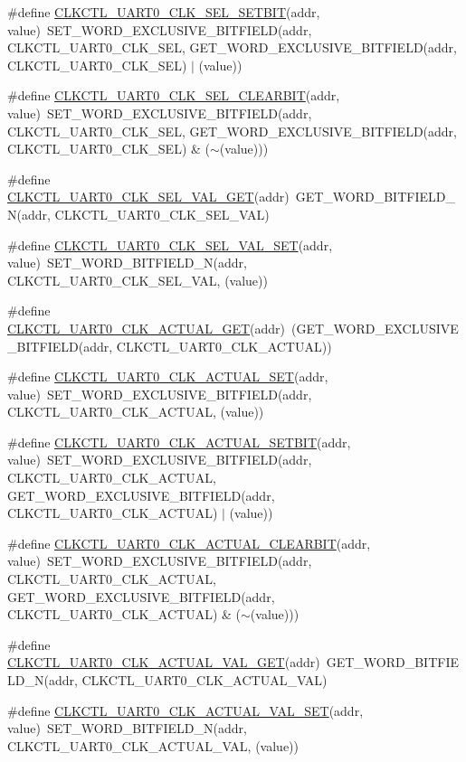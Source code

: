 \begin{DoxyCompactItemize}
\item 
\#define \hyperlink{a00544_acfc5eb0f16914ab40caef3c6a682eee4}{CLKCTL\_\-UART0\_\-CLK\_\-SEL\_\-SETBIT}(addr, value)~SET\_\-WORD\_\-EXCLUSIVE\_\-BITFIELD(addr, CLKCTL\_\-UART0\_\-CLK\_\-SEL, GET\_\-WORD\_\-EXCLUSIVE\_\-BITFIELD(addr, CLKCTL\_\-UART0\_\-CLK\_\-SEL) $|$ (value))
\item 
\#define \hyperlink{a00544_a01dab1e615b3ad7a91deff982d57714c}{CLKCTL\_\-UART0\_\-CLK\_\-SEL\_\-CLEARBIT}(addr, value)~SET\_\-WORD\_\-EXCLUSIVE\_\-BITFIELD(addr, CLKCTL\_\-UART0\_\-CLK\_\-SEL, GET\_\-WORD\_\-EXCLUSIVE\_\-BITFIELD(addr, CLKCTL\_\-UART0\_\-CLK\_\-SEL) \& ($\sim$(value)))
\item 
\#define \hyperlink{a00544_af282521772ffc4c3e067e29255e40f62}{CLKCTL\_\-UART0\_\-CLK\_\-SEL\_\-VAL\_\-GET}(addr)~GET\_\-WORD\_\-BITFIELD\_\-N(addr, CLKCTL\_\-UART0\_\-CLK\_\-SEL\_\-VAL)
\item 
\#define \hyperlink{a00544_a182ae0c94eee905b4bf355fbb393f05d}{CLKCTL\_\-UART0\_\-CLK\_\-SEL\_\-VAL\_\-SET}(addr, value)~SET\_\-WORD\_\-BITFIELD\_\-N(addr, CLKCTL\_\-UART0\_\-CLK\_\-SEL\_\-VAL, (value))
\item 
\#define \hyperlink{a00544_af16d63a80bb74a1513f2ee21a1107c4e}{CLKCTL\_\-UART0\_\-CLK\_\-ACTUAL\_\-GET}(addr)~(GET\_\-WORD\_\-EXCLUSIVE\_\-BITFIELD(addr, CLKCTL\_\-UART0\_\-CLK\_\-ACTUAL))
\item 
\#define \hyperlink{a00544_ab369f2e8c77db17b7274a0655fa80289}{CLKCTL\_\-UART0\_\-CLK\_\-ACTUAL\_\-SET}(addr, value)~SET\_\-WORD\_\-EXCLUSIVE\_\-BITFIELD(addr, CLKCTL\_\-UART0\_\-CLK\_\-ACTUAL, (value))
\item 
\#define \hyperlink{a00544_a40ba46debc5ec6c61e1244d8f8db1e68}{CLKCTL\_\-UART0\_\-CLK\_\-ACTUAL\_\-SETBIT}(addr, value)~SET\_\-WORD\_\-EXCLUSIVE\_\-BITFIELD(addr, CLKCTL\_\-UART0\_\-CLK\_\-ACTUAL, GET\_\-WORD\_\-EXCLUSIVE\_\-BITFIELD(addr, CLKCTL\_\-UART0\_\-CLK\_\-ACTUAL) $|$ (value))
\item 
\#define \hyperlink{a00544_a526cba614e72ecc286c4ec1971ad8963}{CLKCTL\_\-UART0\_\-CLK\_\-ACTUAL\_\-CLEARBIT}(addr, value)~SET\_\-WORD\_\-EXCLUSIVE\_\-BITFIELD(addr, CLKCTL\_\-UART0\_\-CLK\_\-ACTUAL, GET\_\-WORD\_\-EXCLUSIVE\_\-BITFIELD(addr, CLKCTL\_\-UART0\_\-CLK\_\-ACTUAL) \& ($\sim$(value)))
\item 
\#define \hyperlink{a00544_ae27d5b47a1382a7c7b30baa933715397}{CLKCTL\_\-UART0\_\-CLK\_\-ACTUAL\_\-VAL\_\-GET}(addr)~GET\_\-WORD\_\-BITFIELD\_\-N(addr, CLKCTL\_\-UART0\_\-CLK\_\-ACTUAL\_\-VAL)
\item 
\#define \hyperlink{a00544_a4e2d0b1fbad74698153b5da9674846d0}{CLKCTL\_\-UART0\_\-CLK\_\-ACTUAL\_\-VAL\_\-SET}(addr, value)~SET\_\-WORD\_\-BITFIELD\_\-N(addr, CLKCTL\_\-UART0\_\-CLK\_\-ACTUAL\_\-VAL, (value))

\end{DoxyCompactItemize}
